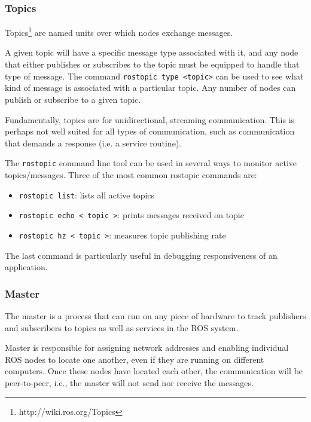\subsubsection{Topics}
\begin{definition}[Topics]
Topics\footnote{http://wiki.ros.org/Topics} are named units over which nodes exchange messages.
\end{definition}

A given topic will have a specific message type associated with it, and any node that either publishes or subscribes to the topic must be equipped to handle that type of message. The command \texttt{rostopic type <topic>} can be used to see what kind of message is associated with a particular topic. Any number of nodes can publish or subscribe to a given topic.

Fundamentally, topics are for unidirectional, streaming communication. This is perhaps not well suited for all types of communication, such as communication that demands a response (i.e. a service routine). 

The \texttt{rostopic} command line tool can be used in several ways to monitor active topics/messages. Three of the most common rostopic commands are:
\begin{itemize}
    \item \texttt{rostopic list}: lists all active topics
    \item \texttt{rostopic echo < topic >}: prints messages received on topic
    \item \texttt{rostopic hz < topic >}: measures topic publishing rate
\end{itemize}
The last command is particularly useful in debugging responsiveness of an application.


\subsubsection{Master}

\begin{definition}[Master]
The master is a process that can run on any piece of hardware to track publishers and subscribers to topics as well as services in the ROS system.
\end{definition}

Master is responsible for assigning network addresses and enabling individual ROS nodes to locate one another, even if they are running on different computers. Once these nodes have located each other, the communication will be peer-to-peer, i.e., the master will not send nor receive the messages.
 
